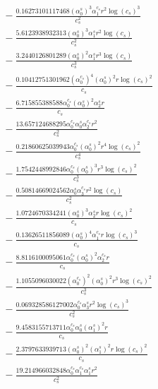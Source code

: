 \documentclass[10pt]{article}
\begin{document}
\begin{align*}
&{}  - \frac{0.16273101117468 \left(\alpha_{0}^s\right)^{3} \alpha_{1}^{c_s} r^{2} \log{\left(c_{s} \right)}^{3}}{c_{s}^{2}} \\
&{}  - \frac{5.6123938932313 \left(\alpha_{0}^s\right)^{3} \alpha_{1}^s r^{2} \log{\left(c_{s} \right)}}{c_{s}^{2}} \\
&{}  - \frac{3.2440126801289 \left(\alpha_{0}^s\right)^{2} \alpha_{1}^s r^{3} \log{\left(c_{s} \right)}}{c_{s}^{3}} \\
&{}  - \frac{0.10412751301962 \left(\alpha_{0}^{c_s}\right)^{4} \left(\alpha_{0}^s\right)^{2} r \log{\left(c_{s} \right)}^{2}}{c_{s}} \\
&{}  - \frac{6.715855388588 \alpha_{0}^{c_s} \left(\alpha_{0}^s\right)^{2} \alpha_{2}^s r}{c_{s}} \\
&{}  - \frac{13.657124688295 \alpha_{0}^{c_s} \alpha_{0}^s \alpha_{2}^{c_s} r^{2}}{c_{s}^{2}} \\
&{}  - \frac{0.21860625039943 \alpha_{0}^{c_s} \left(\alpha_{0}^s\right)^{2} r^{4} \log{\left(c_{s} \right)}^{2}}{c_{s}^{4}} \\
&{}  - \frac{1.7542448992846 \alpha_{0}^{c_s} \left(\alpha_{0}^s\right)^{3} r^{3} \log{\left(c_{s} \right)}^{2}}{c_{s}^{3}} \\
&{}  - \frac{0.50814669024562 \alpha_{0}^s \alpha_{3}^{c_s} r^{2} \log{\left(c_{s} \right)}}{c_{s}^{2}} \\
&{}  - \frac{1.0724670334241 \left(\alpha_{0}^s\right)^{3} \alpha_{2}^s r \log{\left(c_{s} \right)}^{2}}{c_{s}} \\
&{}  - \frac{0.13626511856089 \left(\alpha_{0}^s\right)^{4} \alpha_{1}^{c_s} r \log{\left(c_{s} \right)}^{3}}{c_{s}} \\
&{}  - \frac{8.8116100095061 \alpha_{0}^{c_s} \left(\alpha_{0}^s\right)^{2} \alpha_{2}^{c_s} r}{c_{s}} \\
&{}  - \frac{1.1055096030022 \left(\alpha_{0}^{c_s}\right)^{2} \left(\alpha_{0}^s\right)^{2} r^{3} \log{\left(c_{s} \right)}^{2}}{c_{s}^{3}} \\
&{}  - \frac{0.069328586127002 \alpha_{0}^{c_s} \alpha_{3}^s r^{2} \log{\left(c_{s} \right)}^{3}}{c_{s}^{2}} \\
&{}  - \frac{9.4583155713711 \alpha_{0}^{c_s} \alpha_{0}^s \left(\alpha_{1}^s\right)^{2} r}{c_{s}} \\
&{}  - \frac{2.3797633939713 \left(\alpha_{0}^s\right)^{2} \left(\alpha_{1}^s\right)^{2} r \log{\left(c_{s} \right)}^{2}}{c_{s}} \\
&{}  - \frac{19.214966032848 \alpha_{0}^{c_s} \alpha_{1}^{c_s} \alpha_{1}^s r^{2}}{c_{s}^{2}} \\

\end{align*}
\end{document}
